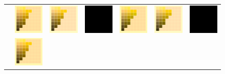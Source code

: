 \begin{figure}[t!]
{\begin{tabular}{ccccccc}
			&\includegraphics[width=.155\linewidth]{img/results_uplift_page11_originalFL11.png}
			&
			\includegraphics[width=.155\linewidth]{img/results_uplift_page11_sigmoidFL11.png}
			& 
			\includegraphics[width=.155\linewidth]{img/toDelete.png}
			&\quad
			\includegraphics[width=.155\linewidth]{img/results_uplift_page12_originalFL11.png}
			&
			\includegraphics[width=.155\linewidth]{img/results_uplift_page12_sigmoidFL11.png}
			&
			\includegraphics[width=.155\linewidth]{img/toDelete.png}
			\\ \raisebox{0.5cm}[0pt][0pt]{\parbox[c][0pt][c]{0cm}{\hspace{-1.5em}\\[20pt]}\par}
			&
			\includegraphics[width=.155\linewidth]{img/results_uplift_page11_originalFL11.png}

\end{tabular}}
\end{figure}
